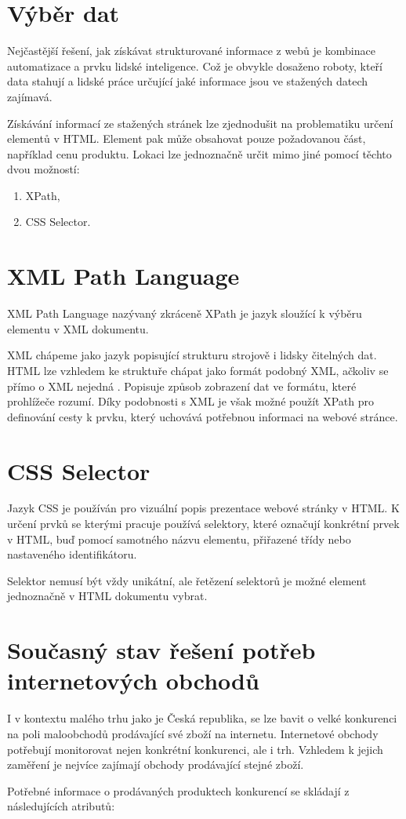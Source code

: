 \documentclass[thesis=B,czech]{FITthesis}[2012/06/26]
\begin{document}
\section{Výběr dat}
Nejčastější řešení, jak získávat strukturované informace z webů je kombinace automatizace a prvku lidské inteligence.
Což je obvykle dosaženo roboty, kteří data stahují a lidské práce určující jaké informace jsou ve stažených datech zajímavá.
\par
Získávání informací ze stažených stránek lze zjednodušit na problematiku určení elementů v HTML.
Element pak může obsahovat pouze požadovanou část, například cenu produktu.
Lokaci lze jednoznačně určit mimo jiné pomocí těchto dvou možností:
\begin{enumerate}
\item XPath,
\item CSS Selector.
\end{enumerate}


\section{XML Path Language}
XML Path Language\cite{XPath} nazývaný zkráceně XPath je jazyk sloužící k výběru elementu v  XML\cite{XML} dokumentu.
\par
XML chápeme jako jazyk popisující strukturu strojově i lidsky čitelných dat.
HTML lze vzhledem ke struktuře chápat jako formát podobný XML, ačkoliv se přímo o XML nejedná \cite{HTML}. 
Popisuje způsob zobrazení dat ve formátu, které prohlížeče rozumí.
Díky podobnosti s XML je však možné použít XPath pro definování cesty k prvku, který uchovává potřebnou informaci na webové stránce.
\par
\section{CSS Selector}
Jazyk CSS je používán pro vizuální popis prezentace webové stránky v HTML. K určení prvků se kterými
pracuje používá selektory, které označují konkrétní prvek v HTML, buď pomocí samotného názvu elementu, přiřazené třídy nebo nastaveného
identifikátoru.\cite{CSS}
\par
Selektor nemusí být vždy unikátní, ale řetězení selektorů je možné element jednoznačně v HTML dokumentu vybrat.

\newpage

\section{Současný stav řešení potřeb internetových obchodů}
I v kontextu malého trhu jako je Česká republika, se lze bavit o velké konkurenci na poli 
maloobchodů prodávající své zboží na internetu.
Internetové obchody potřebují monitorovat nejen konkrétní konkurenci, ale i trh. Vzhledem k jejich zaměření je nejvíce zajímají 
obchody prodávající stejné zboží. 
\par
Potřebné informace o prodávaných produktech konkurencí se skládají z následujících atributů:
\end{document}
